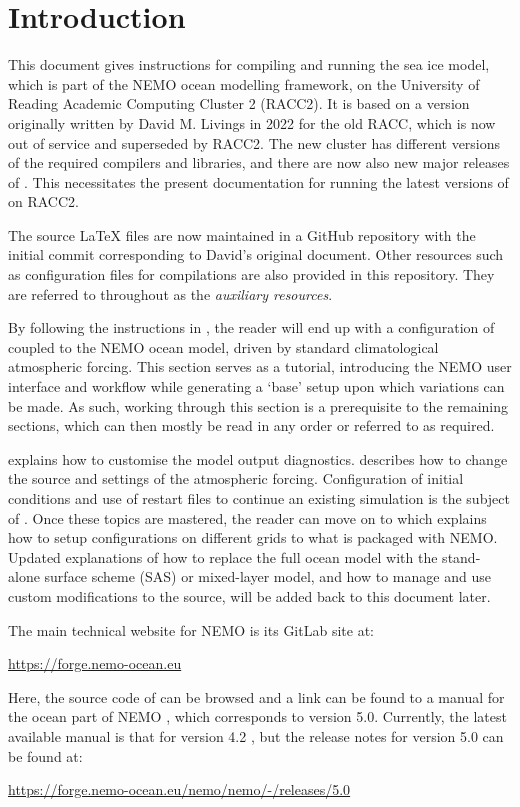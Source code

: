 \clearpage
\section{Introduction}
\label{sec:intro}

This document gives instructions for compiling and running the \SIcu{} sea ice model, which is part of the NEMO ocean modelling framework, on the University of Reading Academic Computing Cluster 2 (RACC2).
It is based on a version originally written by David M. Livings in 2022 for the old RACC, which is now out of service and superseded by RACC2.
The new cluster has different versions of the required compilers and libraries, and there are now also new major releases of \NEMOSIcu{}.
This necessitates the present documentation for running the latest versions of \NEMOSIcu{} on RACC2.

The source \LaTeX{} files are now maintained in a GitHub repository with the initial commit corresponding to David's original document.
Other resources such as configuration files for compilations are also provided in this repository.
They are referred to throughout as the \textit{auxiliary resources}.

By following the instructions in , the reader will end up with a configuration of \SIcu{} coupled to the NEMO ocean model, driven by standard climatological atmospheric forcing.
This section serves as a tutorial, introducing the NEMO user interface and workflow while generating a `base' setup upon which variations can be made.
As such, working through this section is a prerequisite to the remaining sections, which can then mostly be read in any order or referred to as required.

 explains how to customise the model output diagnostics.
 describes how to change the source and settings of the atmospheric forcing.
Configuration of initial conditions and use of restart files to continue an existing simulation is the subject of .
Once these topics are mastered, the reader can move on to  which explains how to setup configurations on different grids to what is packaged with NEMO.
Updated explanations of how to replace the full ocean model with the stand-alone surface scheme (SAS) or mixed-layer model, and how to manage and use custom modifications to the source, will be added back to this document later.

The main technical website for NEMO is its GitLab site at:

\begin{center}
    \url{https://forge.nemo-ocean.eu}
\end{center}

Here, the source code of \NEMOSIcu{} can be browsed and a link can be found to a manual for the ocean part of NEMO \citep{nemo-manual}, which corresponds to version 5.0.
Currently, the latest available \SIcu{} manual is that for version 4.2 \citep{si3-4.2.0}, but the release notes for version 5.0 can be found at:

\begin{center}
    \url{https://forge.nemo-ocean.eu/nemo/nemo/-/releases/5.0}
\end{center}
